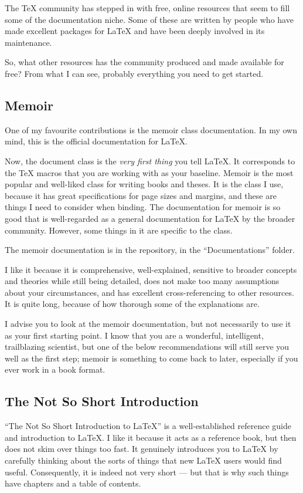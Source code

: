 \documentclass[11pt, oneside]{memoir}
\begin{document}
The TeX community has stepped in with free, online resources that seem to fill some of the documentation niche. Some of these are written by people who have made excellent packages for LaTeX and have been deeply involved in its maintenance.

So, what other resources has the community produced and made available for free? From what I can see, probably everything you need to get started.

\subsection{Memoir}

One of my favourite contributions is the memoir class documentation. In my own mind, this is the official documentation for LaTeX.

Now, the document class is the \emph{very first thing} you tell LaTeX. It corresponds to the TeX macros that you are working with as your baseline. Memoir is the most popular and well-liked class for writing books and theses. It is the class I use, because it has great specifications for page sizes and margins, and these are things I need to consider when binding. The documentation for memoir is so good that is well-regarded as a general documentation for LaTeX by the broader community. However, some things in it are specific to the class.

The memoir documentation is in the repository, in the  ``Documentations'' folder. 

I like it because it is comprehensive, well-explained, sensitive to broader concepts and theories while still being detailed, does not make too many assumptions about your circumstances, and has excellent cross-referencing to other resources. It is quite long, because of how thorough some of the explanations are.

I advise you to look at the memoir documentation, but not necessarily to use it as your first starting point. I know that you are a wonderful, intelligent, trailblazing scientist, but one of the below recommendations will still serve you well as the first step; memoir is something to come back to later, especially if you ever work in a book format.

\subsection{The Not So Short Introduction}

``The Not So Short Introduction to LaTeX'' is a well-established reference guide and introduction to LaTeX. I like it because it acts as a reference book, but then does not skim over things too fast. It genuinely introduces you to LaTeX by carefully thinking about the sorts of things that new LaTeX users would find useful. Consequently, it is indeed not very short — but that is why such things have chapters and a table of contents.
\end{document}

